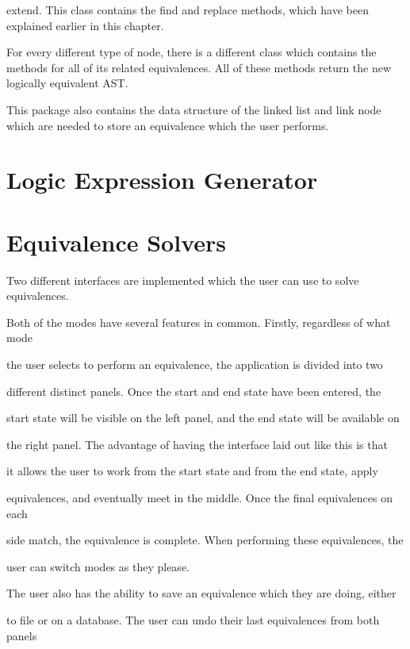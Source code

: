 \documentclass{report}
\begin{document}
extend. This class contains the find and replace methods, which have been explained
earlier in this chapter.

For every different type of node, there is a different class which contains
the methods for all of its related equivalences. All of these methods return
the new logically equivalent AST.

This package also contains the data structure of the linked list and link node
which are needed to store an equivalence which the user performs.



\section{Logic Expression Generator}



\section{Equivalence Solvers}



Two different interfaces are implemented which the user can use to solve equivalences.

Both of the modes have several features in common. Firstly, regardless of what mode

the user selects to perform an equivalence, the application is divided into two

different distinct panels. Once the start and end state have been entered, the

start state will be visible on the left panel, and the end state will be available on

the right panel. The advantage of having the interface laid out like this is that

it allows the user to work from the start state and from the end state, apply

equivalences, and eventually meet in the middle. Once the final equivalences on each

side match, the equivalence is complete. When performing these equivalences, the

user can switch modes as they please.



The user also has the ability to save an equivalence which they are doing, either

to file or on a database. The user can undo their last equivalences from both panels
\end{document}
